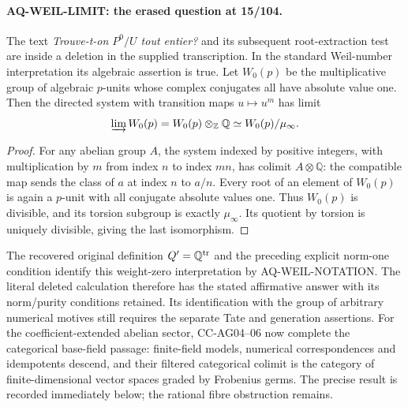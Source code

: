 \documentclass[11pt,a4paper]{article}
\theoremstyle{definition}\newtheorem{definition}[theorem]{Definition}
\theoremstyle{remark}\newtheorem{remark}[theorem]{Remark}
\begin{document}
\paragraph{AQ-WEIL-LIMIT: the erased question at 15/104.}
The text \emph{Trouve-t-on $P^0/U$ tout entier?}
and its subsequent root-extraction test are inside a
deletion in the supplied transcription. In the standard
Weil-number interpretation its algebraic assertion is true.
Let $W_0(p)$ be the multiplicative group of algebraic
$p$-units whose complex conjugates all have absolute
value one. Then the directed system with transition
maps $u\mapsto u^m$ has limit
\[
 \varinjlim W_0(p)=W_0(p)\otimes_{\mathbb Z}\mathbb Q
                 \simeq W_0(p)/\mu_\infty .
\]
\begin{proof}
For any abelian group $A$, the system indexed by
positive integers, with multiplication by $m$ from
index $n$ to index $mn$, has colimit
$A\otimes\mathbb Q$: the compatible map sends
the class of $a$ at index $n$ to $a/n$.
Every root of an element of $W_0(p)$ is again
a $p$-unit with all conjugate absolute values one.
Thus $W_0(p)$ is divisible, and its torsion subgroup
is exactly $\mu_\infty$. Its quotient by torsion
is uniquely divisible, giving the last isomorphism.
\end{proof}
The recovered original definition $Q'=\mathbb Q^{\rm tr}$
and the preceding explicit norm-one condition identify
this weight-zero interpretation by AQ-WEIL-NOTATION.
The literal deleted calculation therefore has the stated
affirmative answer with its norm/purity conditions retained.
Its identification with the group of arbitrary numerical motives
still requires the separate Tate and generation assertions.
For the coefficient-extended abelian sector, CC-AG04--06 now
complete the categorical base-field passage: finite-field models,
numerical correspondences and idempotents descend, and their
filtered categorical colimit is the category of finite-dimensional
vector spaces graded by Frobenius germs. The precise result is
recorded immediately below; the rational fibre obstruction remains.
\end{document}
